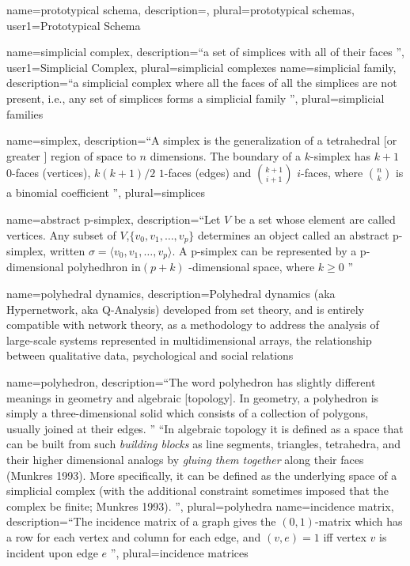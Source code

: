 {
  name=prototypical schema,
  description={},
  plural={prototypical schemas},
  user1={Prototypical Schema}
}


{
  name=simplicial complex,
  description={``a set of simplices with all of their faces \citep{johnson2013hypernetworks}''},
  user1={Simplicial Complex},
  plural={simplicial complexes}
}
{
  name=simplicial family,
  description={``a simplicial complex where all the faces of all the simplices are not present, i.e., any set of simplices forms a simplicial family \citep{johnson2013hypernetworks}''},
  plural={simplicial families}
}

{
  name=simplex,
  description={``A simplex is the generalization of a tetrahedral [or greater \citep{johnson1995multidimensional}] region of space to $n$ dimensions.  The boundary of a $k$-simplex has $k+1$ $0$-faces (vertices),  $k(k+1)/2$ $1$-faces (edges) and $\binom{k+1}{i+1}$ $i$-faces, where $\binom{n}{k}$ is a binomial coefficient \citep{WolframMathWorld}''},
  plural={simplices}
}

{
  name=abstract p-simplex,
  description={``Let $V$ be a set whose element are called vertices. Any subset of $V$,$%
\{v_{0},v_{1},\ldots ,v_{p}\}$ determines an object called an abstract
p-simplex, written $\sigma =\langle v_{0},v_{1},\ldots ,v_{p}\rangle $. A
p-simplex can be represented by a p-dimensional polyhedhron in$(p+k)$%
-dimensional space, where $k\geq 0$ \citep{johnson2013hypernetworks}''}
}


{
  name=polyhedral dynamics,
  description={Polyhedral dynamics (aka Hypernetwork, aka Q-Analysis) developed from set theory, and is entirely compatible with
network theory, as a methodology to address the analysis of large-scale
systems represented in multidimensional arrays, the relationship between qualitative data, psychological and social relations \citep{casti1977polyhedral, johnson2013hypernetworks, PolyhedralEmpowerment}}
}


{
  name=polyhedron,
  description={``The word polyhedron has slightly different meanings in geometry and algebraic [topology]. In geometry, a polyhedron is simply a three-dimensional solid which consists of a collection of polygons, usually joined at their edges. \citep{WolframMathWorld}''
  ``In algebraic topology it is defined as a space that can be built from such \emph{building blocks} as line segments, triangles, tetrahedra, and their higher dimensional analogs by \emph{gluing them together} along their faces (Munkres 1993).  More specifically, it can be defined as the underlying space of a simplicial complex (with the additional constraint sometimes imposed that the complex be finite; Munkres 1993). \citep{monk1974connections, WolframMathWorld}''},
  plural={polyhedra}
}
{
  name=incidence matrix,
  description={``The incidence matrix of a graph gives the $(0,1)$-matrix which has a row for each vertex and column for each edge, and $(v,e)=1$ iff vertex $v$ is incident upon edge $e$ \citep{WolframMathWorld}''},
  plural={incidence matrices}
}

